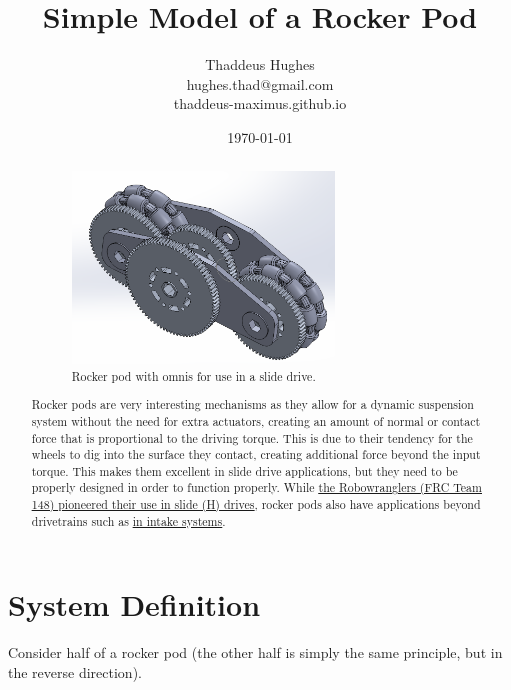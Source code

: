 \documentclass[10pt,letterpaper]{article}
\author{Thaddeus Hughes \\ hughes.thad@gmail.com \\ thaddeus-maximus.github.io}
\date{\today}
\title{Simple Model of a Rocker Pod}
\begin{document}
	\maketitle
	
	\begin{abstract}
		\begin{figure}[H]
			\includegraphics[width=0.7\textwidth]{drivetrain_slide_rocker.png}
			\caption{Rocker pod with omnis for use in a slide drive.}
		\end{figure}
		Rocker pods are very interesting mechanisms as they allow for a dynamic suspension system without the need for extra actuators, creating an amount of normal or contact force that is proportional to the driving torque. This is due to their tendency for the wheels to dig into the surface they contact, creating additional force beyond the input torque. This makes them excellent in slide drive applications, but they need to be properly designed in order to function properly. While \href{https://johnvneun.com/blog/2019/1/3/x019-prototype}{\color{red}\underline{the Robowranglers (FRC Team 148) pioneered their use in slide (H) drives}}, rocker pods also have applications beyond drivetrains such as \href{https://www.youtube.com/watch?v=q8VA5kmzAPk}{\color{red}\underline{in intake systems}}.
	\end{abstract}
	
	\section*{System Definition}
	
	Consider half of a rocker pod (the other half is simply the same principle, but in the reverse direction).	
	
\end{document}
